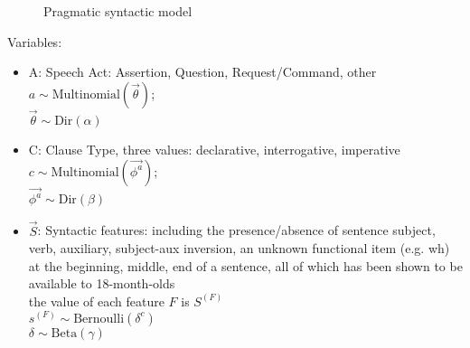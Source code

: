 \documentclass[../main.tex]{subfiles}
\begin{document}
\begin{figure}[h]
\begin{center}
\end{center}
\caption{Pragmatic syntactic model}\label{fg:model}
\end{figure}

Variables:
\begin{itemize}
\item A: Speech Act: Assertion, Question, Request/Command, other\\
$ a \sim \mbox{Multinomial}(\vec{\theta})$;\\
$\vec{\theta} \sim \mbox{Dir}(\alpha)$
\item C: Clause Type, three values: declarative, interrogative, imperative\\
$ c \sim \mbox{Multinomial}(\vec{\phi^{a}})$;\\
$\vec{\phi^{a}} \sim \mbox{Dir}(\beta)$
\item $\vec{S}$: Syntactic features: including the presence/absence of sentence subject, verb, auxiliary, subject-aux inversion, an unknown functional item (e.g. wh) at the beginning, middle, end of a sentence, all of which has been shown to be available to 18-month-olds\\
the value of each feature $F$ is $S^{(F)}$ \\
$s^{(F)} \sim \mbox{Bernoulli}(\delta^{c})$ \\
$\delta\sim \mbox{Beta}(\gamma)$
\end{itemize}
\end{document}
